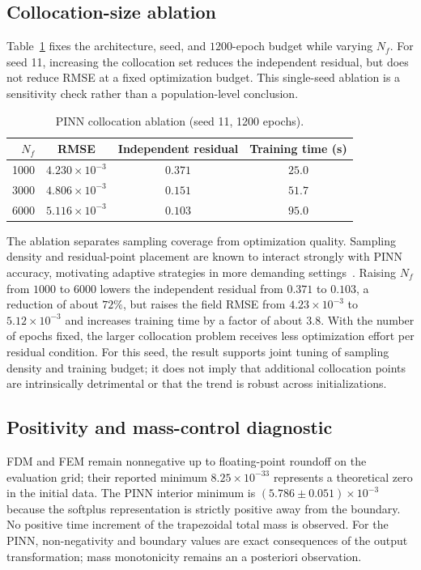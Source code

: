 \subsection{Collocation-size ablation}

Table~\ref{tab:ablation} fixes the architecture, seed, and $1200$-epoch budget while varying $N_f$. For seed 11, increasing the collocation set reduces the independent residual, but does not reduce RMSE at a fixed optimization budget. This single-seed ablation is a sensitivity check rather than a population-level conclusion.

\begin{table}[!htbp]
\centering
\caption{PINN collocation ablation (seed 11, 1200 epochs).}
\label{tab:ablation}
\begin{tabular}{rccc}
\toprule
$N_f$ & RMSE & Independent residual & Training time (s)\\
\midrule
1000 & $4.230\times10^{-3}$ & $0.371$ & $25.0$\\
3000 & $4.806\times10^{-3}$ & $0.151$ & $51.7$\\
6000 & $5.116\times10^{-3}$ & $0.103$ & $95.0$\\
\bottomrule
\end{tabular}
\end{table}

The ablation separates sampling coverage from optimization quality. Sampling density and residual-point placement are known to interact strongly with PINN accuracy, motivating adaptive strategies in more demanding settings~\cite{wu2023sampling}. Raising $N_f$ from $1000$ to $6000$ lowers the independent residual from $0.371$ to $0.103$, a reduction of about $72\%$, but raises the field RMSE from $4.23\times10^{-3}$ to $5.12\times10^{-3}$ and increases training time by a factor of about $3.8$. With the number of epochs fixed, the larger collocation problem receives less optimization effort per residual condition. For this seed, the result supports joint tuning of sampling density and training budget; it does not imply that additional collocation points are intrinsically detrimental or that the trend is robust across initializations.

\subsection{Positivity and mass-control diagnostic}

FDM and FEM remain nonnegative up to floating-point roundoff on the evaluation grid; their reported minimum $8.25\times10^{-33}$ represents a theoretical zero in the initial data. The PINN interior minimum is $(5.786\pm0.051)\times10^{-3}$ because the softplus representation is strictly positive away from the boundary. No positive time increment of the trapezoidal total mass is observed. For the PINN, non-negativity and boundary values are exact consequences of the output transformation; mass monotonicity remains an a posteriori observation.

